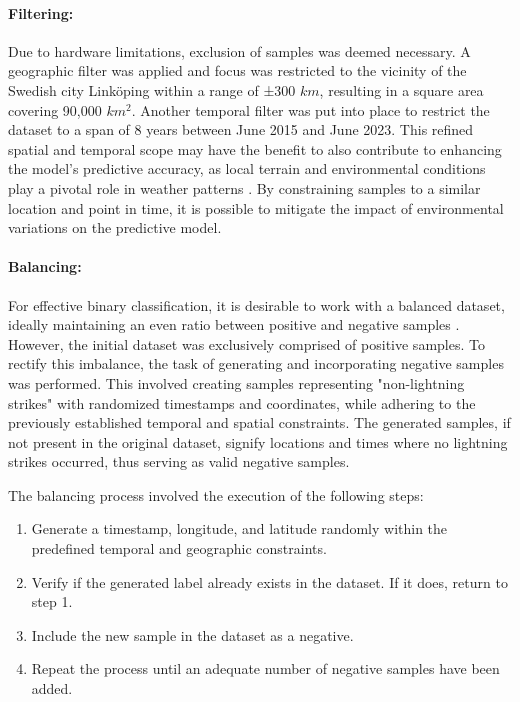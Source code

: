 \paragraph{Filtering:}
\label{sec:preprocessing-light-filtering}
Due to hardware limitations, exclusion of samples was deemed necessary. A geographic filter was applied and focus was restricted to the vicinity of the Swedish city Linköping within a range of ±300 $km$, resulting in a square area covering 90,000 $km^2$. Another temporal filter was put into place to restrict the dataset to a span of 8 years between June 2015 and June 2023. This refined spatial and temporal scope may have the benefit to also contribute to enhancing the model's predictive accuracy, as local terrain and environmental conditions play a pivotal role in weather patterns \cite{topology-effect}. By constraining samples to a similar location and point in time, it is possible to mitigate the impact of environmental variations on the predictive model.

\paragraph{Balancing:}
For effective binary classification, it is desirable to work with a balanced dataset, ideally maintaining an even ratio between positive and negative samples \cite{balanced-data}. However, the initial dataset was exclusively comprised of positive samples. To rectify this imbalance, the task of generating and incorporating negative samples was performed. This involved creating samples representing "non-lightning strikes" with randomized timestamps and coordinates, while adhering to the previously established temporal and spatial constraints. The generated samples, if not present in the original dataset, signify locations and times where no lightning strikes occurred, thus serving as valid negative samples.

The balancing process involved the execution of the following steps:

\begin{enumerate}
	\item Generate a timestamp, longitude, and latitude randomly within the predefined temporal and geographic constraints.
	\item Verify if the generated label already exists in the dataset. If it does, return to step 1.
	\item Include the new sample in the dataset as a negative.
	\item Repeat the process until an adequate number of negative samples have been added.
\end{enumerate}

